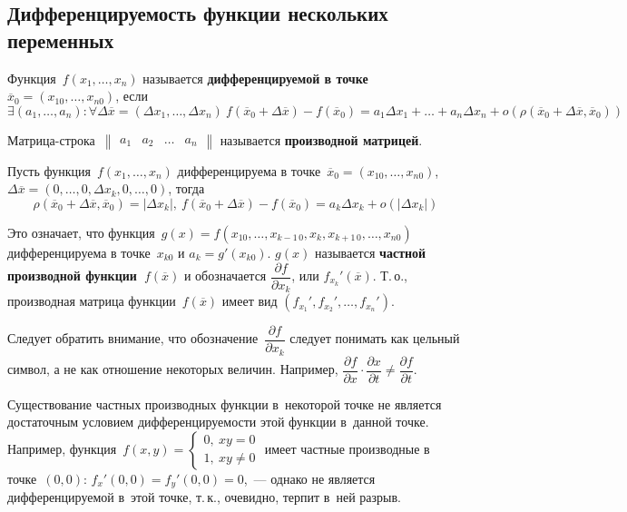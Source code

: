 \subsection{Дифференцируемость функции нескольких переменных}
 Функция~$f(x_1, \ldots, x_n)$ называется \textbf{дифференцируемой в точке~$\overline x_0 = (x_{10}, \ldots, x_{n0})$}, если
\begin{equation*}
\exists (a_1, \ldots, a_n) \colon \forall \Delta \overline x = (\Delta x_1, \ldots, \Delta x_n) \
f(\overline x_0 + \Delta \overline x) - f(\overline x_0) =
a_1 \Delta x_1 + \ldots + a_n \Delta x_n + o(\rho(\overline x_0 + \Delta \overline x, \overline x_0))
\end{equation*}

 Матрица-строка~$\begin{Vmatrix}
a_1 & a_2 & \ldots & a_n
\end{Vmatrix}$ называется \textbf{производной матрицей}.

Пусть функция~$f(x_1, \ldots, x_n)$ дифференцируема в точке~$\overline x_0 = (x_{10}, \ldots, \allowbreak x_{n0})$, $\Delta \overline x = (0, \ldots, \allowbreak 0, \Delta x_k, \allowbreak 0, \ldots, \allowbreak 0)$, тогда
\begin{equation*}
\rho(\overline x_0 + \Delta \overline x, \overline x_0) = |\Delta x_k|, \
f(\overline x_0 + \Delta \overline x) - f(\overline x_0) =
a_k \Delta x_k + o(|\Delta x_k|)
\end{equation*}

Это означает, что функция~$g(x) = f(x_{10}, \ldots, x_{k-1\, 0}, x_k, x_{k+1\, 0}, \ldots, x_{n0})$ дифференцируема в точке~$x_{k0}$ и $a_k = g'(x_{k0})$.
 $g(x)$ называется \textbf{частной производной функции~$f(\overline x)$} и обозначается $\dfrac{\partial f}{\partial x_k}$, или $f_{x_k}'(\overline x)$.
Т.\,о., производная матрица функции~$f(\overline x)$ имеет вид $(f_{x_1}', f_{x_2}', \ldots, f_{x_n}')$.

Следует обратить внимание, что обозначение~$\dfrac{\partial f}{\partial x_k}$ следует понимать как цельный символ, а не как отношение некоторых величин.
Например, $\dfrac{\partial f}{\partial x} \cdot \dfrac{\partial x}{\partial t} \neq \dfrac{\partial f}{\partial t}$.

Существование частных производных функции в~некоторой точке не является достаточным условием дифференцируемости этой функции в~данной точке.
Например, функция~$f(x, y) =
\begin{cases}
0, \ xy = 0 \\
1, \ xy \neq 0
\end{cases}$
имеет частные производные в точке~$(0, 0)$: $f_x'(0, 0) = f_y'(0, 0) = 0$,~--- однако не является дифференцируемой в~этой точке, т.\,к., очевидно, терпит в~ней разрыв.

